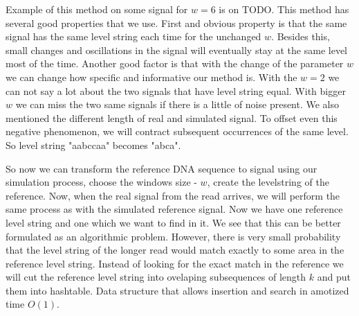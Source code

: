 
Example of this method on some signal for $w=6$ is on TODO. This method has several good
properties that we use. First and obvious property is that the same signal has the
same level string each time for the unchanged $w$. Besides this, small changes and
oscillations in the signal will eventually stay at the same level most of the time.
Another good factor is that with the change of the parameter $w$ we can change how specific
and informative our method is. With the $w=2$ we can not say a lot about the two signals
that have level string equal. With bigger $w$ we can miss the two same signals
if there is a little of noise present. We also mentioned the different length of
real and simulated signal. To offset even this negative phenomenon, we will contract
subsequent occurrences of the same level. So level string "aabccaa" becomes "abca".

So now we can transform the reference DNA sequence to signal using our simulation
process, choose the windows size - $w$, create the levelstring of the reference.
Now, when the real signal from the read arrives, we will perform the same process
as with the simulated reference signal. Now we have one reference level string and
one which we want to find in it. We see that this can be better formulated as an
algorithmic problem. However, there is very small probability that the level string
of the longer read would match exactly to some area in the reference level string.
Instead of looking for the exact match in the reference we will cut the reference
level string into ovelaping subsequences of length $k$ and put them into hashtable.
Data structure that allows insertion and search in amotized time $O(1)$.
